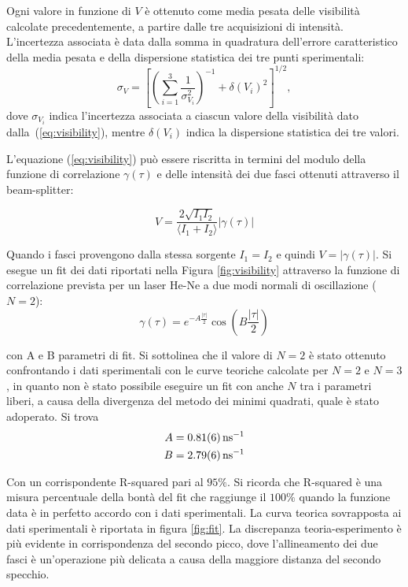 \documentclass[10pt,oneside,a4paper]{article}
\begin{document}
\begin{multicols}{2}
Ogni valore in funzione di $V$ è ottenuto come media pesata delle visibilità calcolate precedentemente, a partire dalle tre acquisizioni di intensità. L'incertezza associata è data dalla somma in quadratura dell'errore caratteristico della media pesata e della dispersione statistica dei tre punti sperimentali:
\[
\sigma_V = \left[ \left( \sum_{i=1}^3 \frac{1}{\sigma_\text{$V_i$}^2}\right)^{-1} + \delta(V_i)^2 \right]^{1/2}, 
\]
dove $\sigma_\text{$V_i$}$ indica l'incertezza associata a ciascun valore della visibilità dato dalla~(\ref{eq:visibility}), mentre $\delta(V_i)$ indica la dispersione statistica dei tre valori.

L'equazione (\ref{eq:visibility}) può essere riscritta in termini del modulo della funzione di correlazione $\gamma(\tau)$ e delle intensità dei due fasci ottenuti attraverso il beam-splitter:

\begin{equation}\label{eq:visibility2}
V = \frac{2\sqrt{I_1 I_2}}{\langle I_1 + I_2 \rangle}\vert \gamma(\tau) \vert
\end{equation}

Quando i fasci provengono dalla stessa sorgente $I_1=I_2$ e quindi $V = \vert\gamma(\tau)\vert$. Si esegue un fit dei dati riportati nella Figura \ref{fig:visibility} attraverso la funzione di correlazione prevista per un laser He-Ne a due modi normali di oscillazione ($N=2$):
\[
\gamma(\tau) = e^{-A\frac{\vert\tau\vert}{2}}\cos\left({B\frac{\vert\tau\vert}{2}}\right)
\]

con A e B parametri di fit. Si sottolinea che il valore di $N=2$ è stato ottenuto confrontando i dati sperimentali con le curve teoriche calcolate per $N=2$ e $N=3$, in quanto non è stato possibile eseguire un fit con anche $N$ tra i parametri liberi, a causa della divergenza del metodo dei minimi quadrati, quale è stato adoperato. Si trova
\[
\begin{aligned}
A &= \SI{0.81 \pm 0.06}{\nano\second}^{-1} \\
B &= \SI{2.79 \pm 0.06}{\nano\second}^{-1} \\
\end{aligned}
\]

Con un corrispondente R-squared pari al $95\%$. Si ricorda che R-squared è una misura percentuale della bontà del fit che raggiunge il $100\%$ quando la funzione data è in perfetto accordo con i dati sperimentali. La curva teorica sovrapposta ai dati sperimentali è riportata in figura \ref{fig:fit}. La discrepanza teoria-esperimento è più evidente in corrispondenza del secondo picco, dove l'allineamento dei due fasci è un'operazione più delicata a causa della maggiore distanza del secondo specchio.


\end{multicols}
\end{document}
